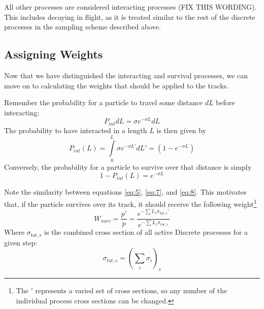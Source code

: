\documentclass[12pt]{article}
\begin{document}
All other processes are considered interacting processes (FIX THIS WORDING). This includes decaying in flight, as it is treated similar to the rest of the discrete processes in the sampling scheme described above. 

\subsection{Assigning Weights}

Now that we have distinguished the interacting and survival processes, we can move on to calculating the weights that should be applied to the tracks. 

Remember the probability for a particle to travel some distance $dL$ before interacting:
\begin{equation}\label{eq:6}
P_{int}dL = \sigma e^{-\sigma L}dL
\end{equation}
The probability to have interacted in a length $L$ is then given by \\
\begin{equation}\label{eq:7}
P_{int}(L) = \int\limits_{0}^{L}\sigma e^{-\sigma L'}dL' = (1 - e^{-\sigma L})
\end{equation}
Conversely, the probability for a particle to survive over that distance is simply \\
\begin{equation}\label{eq:8}
1 - P_{int}(L) = e^{-\sigma L}
\end{equation}

Note the similarity between equations \ref{eq:5}, \ref{eq:7}, and \ref{eq:8}. This motivates that, if the particle survives over its track, it should receive the following weight\footnote{The $'$ represents a varied set of cross sections, so any number of the individual process cross sections can be changed.}
\begin{equation}\label{eq:9}
W_{surv} = \frac{p'}{p} = \frac{e^{-\sum L_s  \sigma_{tot,s}'} }{e^{-\sum L_s  \sigma_{tot,s}}}
\end{equation}
Where $\sigma_{tot,s}$ is the combined cross section of all active Discrete processes for a given step:
\begin{equation}
\sigma_{tot,s} = (\sum \limits_i \sigma_i)_s
\end{equation}
\end{document}
